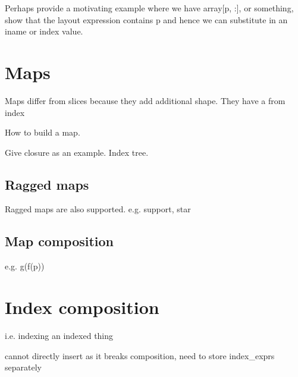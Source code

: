 \documentclass[thesis]{subfiles}
\begin{document}
Perhaps provide a motivating example where we have array[p, :], or something, show that the layout expression contains p and hence we can substitute in an iname or index value.

\section{Maps}

Maps differ from slices because they add additional shape. They have a from index

How to build a map.

Give closure as an example. Index tree.

\subsection{Ragged maps}

Ragged maps are also supported. e.g. support, star

\subsection{Map composition}

e.g. g(f(p))

\section{Index composition}

i.e. indexing an indexed thing


cannot directly insert as it breaks composition, need to store index\_exprs separately
\end{document}
